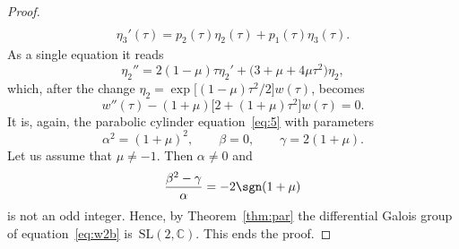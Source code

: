 \begin{proof}
\begin{gather*}
 \\
 \eta_3'(\tau) = p_2(\tau) \eta_2(\tau) + p_1(\tau)\eta_3(\tau).
 \end{gather*}
 As a single equation it reads
 \begin{equation*}
 \eta_2'' = 2(1-\mu)\tau \eta_2' + \big(3+\mu+4\mu \tau^2\big)\eta_2,
 \end{equation*}
 which, after the change $\eta_2=\exp\big[(1-\mu)\tau^2/2\big]w(\tau)$, becomes
 \begin{equation}
 \label{eq:w2b}
 w''(\tau) -(1+\mu)\big[2 +(1+\mu)\tau^2\big]w(\tau)=0.
 \end{equation}
 It is, again, the parabolic cylinder equation~\eqref{eq:5} with parameters
 \begin{equation*}
 \alpha^2= (1+\mu)^2, \qquad
 \beta=0, \qquad
 \gamma = 2(1+\mu).
 \end{equation*}
 Let us assume that $\mu\neq-1$. Then $\alpha\neq 0$ and
 \[
 \frac{\beta^2-\gamma}{\alpha}=-2\sgn(1+\mu)
 \]
 is not an odd integer. Hence, by Theorem~\ref{thm:par} the
 differential Galois group of equation~\eqref{eq:w2b} is~$\mathrm{SL}(2,\mathbb{C})$. This ends the proof.
\end{proof}
